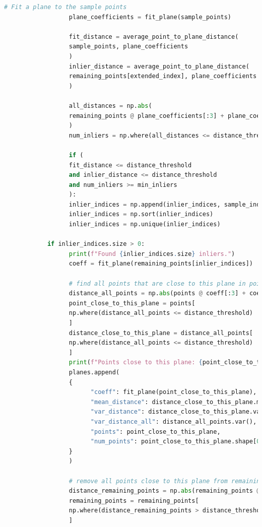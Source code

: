 \documentclass[conference,onecolumn]{IEEEtran}
\begin{document}
\begin{enumerate}[label=\arabic{enumi}.]
\begin{enumerate}
\begin{lstlisting}[language=Python]
                  # Fit a plane to the sample points
                  plane_coefficients = fit_plane(sample_points)

                  fit_distance = average_point_to_plane_distance(
                  sample_points, plane_coefficients
                  )
                  inlier_distance = average_point_to_plane_distance(
                  remaining_points[extended_index], plane_coefficients
                  )

                  all_distances = np.abs(
                  remaining_points @ plane_coefficients[:3] + plane_coefficients[3]
                  )
                  num_inliers = np.where(all_distances <= distance_threshold)[0].size

                  if (
                  fit_distance <= distance_threshold
                  and inlier_distance <= distance_threshold
                  and num_inliers >= min_inliers
                  ):
                  inlier_indices = np.append(inlier_indices, sample_indices)
                  inlier_indices = np.sort(inlier_indices)
                  inlier_indices = np.unique(inlier_indices)

            if inlier_indices.size > 0:
                  print(f"Found {inlier_indices.size} inliers.")
                  coeff = fit_plane(remaining_points[inlier_indices])

                  # find all points that are close to this plane in points
                  distance_all_points = np.abs(points @ coeff[:3] + coeff[3])
                  point_close_to_this_plane = points[
                  np.where(distance_all_points <= distance_threshold)
                  ]
                  distance_close_to_this_plane = distance_all_points[
                  np.where(distance_all_points <= distance_threshold)
                  ]
                  print(f"Points close to this plane: {point_close_to_this_plane.shape[0]}")
                  planes.append(
                  {
                        "coeff": fit_plane(point_close_to_this_plane),
                        "mean_distance": distance_close_to_this_plane.mean(),
                        "var_distance": distance_close_to_this_plane.var(),
                        "var_distance_all": distance_all_points.var(),
                        "points": point_close_to_this_plane,
                        "num_points": point_close_to_this_plane.shape[0],
                  }
                  )

                  # remove all points close to this plane from remaining points
                  distance_remaining_points = np.abs(remaining_points @ coeff[:3] + coeff[3])
                  remaining_points = remaining_points[
                  np.where(distance_remaining_points > distance_threshold)
                  ]


\end{lstlisting}
\end{enumerate}
\end{enumerate}
\end{document}
